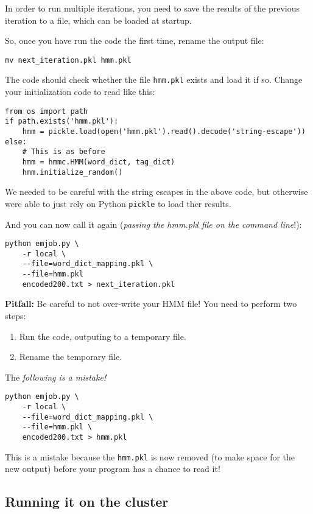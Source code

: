In order to run multiple iterations, you need to save the results of the
previous iteration to a file, which can be loaded at startup.

So, once you have run the code the first time, rename the output file:

\begin{verbatim}
mv next_iteration.pkl hmm.pkl
\end{verbatim}

The code should check whether the file \verb+hmm.pkl+ exists and load it if so.
Change your initialization code to read like this:

\begin{verbatim}
from os import path
if path.exists('hmm.pkl'):
    hmm = pickle.load(open('hmm.pkl').read().decode('string-escape'))
else:
    # This is as before
    hmm = hmmc.HMM(word_dict, tag_dict)
    hmm.initialize_random()
\end{verbatim}

We needed to be careful with the string escapes in the above code, but
otherwise were able to just rely on Python \verb+pickle+ to load ther results.

And you can now call it again (\emph{passing the hmm.pkl file on the command
line}!):

\begin{verbatim}
python emjob.py \
    -r local \
    --file=word_dict_mapping.pkl \
    --file=hmm.pkl
    encoded200.txt > next_iteration.pkl
\end{verbatim}

\textbf{Pitfall:} Be careful to not over-write your HMM file! You need to
perform two steps:

\begin{enumerate}
\item Run the code, outputing to a temporary file.
\item Rename the temporary file.
\end{enumerate}

The \emph{following is a mistake!}
\begin{verbatim}
python emjob.py \
    -r local \
    --file=word_dict_mapping.pkl \
    --file=hmm.pkl \
    encoded200.txt > hmm.pkl
\end{verbatim}

This is a mistake because the \verb+hmm.pkl+ is now removed (to make space for
the new output) before your program has a chance to read it!

\subsection{Running it on the cluster}

